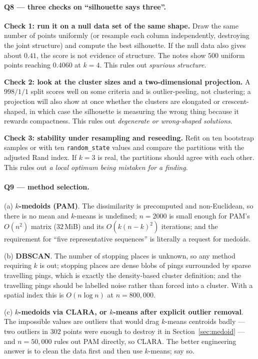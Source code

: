 \documentclass[11pt]{article}
\begin{document}
\paragraph{Q8 --- three checks on ``silhouette says three''.}
\textbf{Check 1: run it on a null data set of the same shape.} Draw the same
number of points uniformly (or resample each column independently, destroying
the joint structure) and compute the best silhouette. If the null data also
gives about $0.41$, the score is not evidence of structure. The notes show
$500$ uniform points reaching $0.4060$ at $k=4$. This rules out
\emph{spurious structure}.

\textbf{Check 2: look at the cluster sizes and a two-dimensional
projection.} A $998/1/1$ split scores well on some criteria and is
outlier-peeling, not clustering; a projection will also show at once whether
the clusters are elongated or crescent-shaped, in which case the silhouette
is measuring the wrong thing because it rewards compactness. This rules out
\emph{degenerate or wrong-shaped solutions}.

\textbf{Check 3: stability under resampling and reseeding.} Refit on ten
bootstrap samples or with ten \texttt{random\_state} values and compare the
partitions with the adjusted Rand index. If $k = 3$ is real, the partitions
should agree with each other. This rules out \emph{a local optimum being
mistaken for a finding}.

\paragraph{Q9 --- method selection.}
(a) \textbf{$k$-medoids (PAM)}. The dissimilarity is precomputed and
non-Euclidean, so there is no mean and $k$-means is undefined; $n = 2000$ is
small enough for PAM's $O(n^2)$ matrix ($32$\,MiB) and its $O(k(n-k)^2)$
iterations; and the requirement for ``five representative sequences'' is
literally a request for medoids.

(b) \textbf{DBSCAN}. The number of stopping places is unknown, so any method
requiring $k$ is out; stopping places are dense blobs of pings surrounded by
sparse travelling pings, which is exactly the density-based cluster
definition; and the travelling pings should be labelled noise rather than
forced into a cluster. With a spatial index this is $O(n \log n)$ at
$n = 800{,}000$.

(c) \textbf{$k$-medoids via CLARA, or $k$-means after explicit outlier
removal}. The impossible values are outliers that would drag $k$-means
centroids badly --- two outliers in $302$ points were enough to destroy it in
Section~\ref{sec:medoid} --- and $n = 50{,}000$ rules out PAM directly, so
CLARA. The better engineering answer is to clean the data first and then use
$k$-means; say so.
\end{document}

